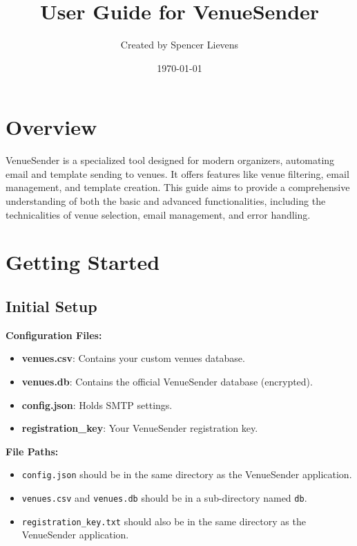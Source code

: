 \documentclass{article}
\title{\color{textcolor}User Guide for VenueSender}
\author{Created by Spencer Lievens}
\date{\today}
\begin{document}
	
	\maketitle
	\tableofcontents

	\section{Overview}
	
	VenueSender is a specialized tool designed for modern organizers, automating email and template sending to venues. It offers features like venue filtering, email management, and template creation. This guide aims to provide a comprehensive understanding of both the basic and advanced functionalities, including the technicalities of venue selection, email management, and error handling.
	
	\section{Getting Started}
	
	\subsection{Initial Setup}
	
	\textbf{Configuration Files:}
	
	\begin{itemize}
		\item \textbf{venues.csv}: Contains your custom venues database.
		\item \textbf{venues.db}: Contains the official VenueSender database (encrypted).
		\item \textbf{config.json}: Holds SMTP settings.
		\item \textbf{registration\_key}: Your VenueSender registration key.
	\end{itemize}
	
	\textbf{File Paths:}
	
	\begin{itemize}
		\item \texttt{config.json} should be in the same directory as the VenueSender application.
		\item \texttt{venues.csv} and \texttt{venues.db} should be in a sub-directory named \texttt{db}.
		\item \texttt{registration\_key.txt} should also be in the same directory as the VenueSender application.
	\end{itemize}
	
\end{document}

